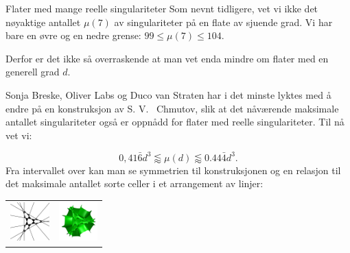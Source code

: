 \begin{surferPage}{Flater med mange reelle singulariteter}
    Som nevnt tidligere, vet vi ikke det nøyaktige antallet 
    $\mu(7)$ av singulariteter på en flate av sjuende grad.
    Vi har bare en øvre og en nedre grense: $99\le \mu(7) \le 104$. 

	Derfor er det ikke så overraskende at man vet enda mindre om flater med en generell grad $d$.
	
	Sonja Breske, Oliver Labs og Duco van Straten har i det minste lyktes med å endre på en konstruksjon 
	av S. V. \ Chmutov, slik at det nåværende maksimale antallet
	singulariteter også er oppnådd for flater med reelle singulariteter. Til nå vet vi:
 
    \[0,41\bar{6}d^3 \lessapprox \mu(d) \lessapprox 0.44\bar{4} d^3.\]
Fra intervallet over kan man se symmetrien til konstruksjonen og en relasjon til det maksimale antallet sorte celler i et arrangement av linjer:
    \begin{center}
      \begin{tabular}{c@{\qquad}c}
        \includegraphics[height=1.5cm]{./../../common/images/vielesing.pdf}
        &
        \includegraphics[height=1.5cm]{./../../common/images/p9surface_von_oben}
      \end{tabular}
    \end{center}
\end{surferPage}

